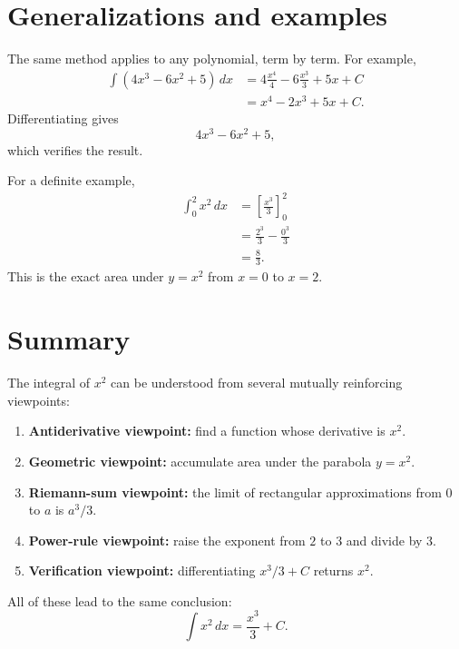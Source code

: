 \documentclass[11pt]{article}
\begin{document}
\section{Generalizations and examples}

The same method applies to any polynomial, term by term. For example,
\begin{align*}
\int \left(4x^3-6x^2+5\right)\,dx
&=4\frac{x^4}{4}-6\frac{x^3}{3}+5x+C\\
&=x^4-2x^3+5x+C.
\end{align*}
Differentiating gives
\[
4x^3-6x^2+5,
\]
which verifies the result.

For a definite example,
\begin{align*}
\int_0^2 x^2\,dx
&=\left[\frac{x^3}{3}\right]_0^2\\
&=\frac{2^3}{3}-\frac{0^3}{3}\\
&=\frac{8}{3}.
\end{align*}
This is the exact area under $y=x^2$ from $x=0$ to $x=2$.

\section{Summary}

The integral of $x^2$ can be understood from several mutually reinforcing viewpoints:
\begin{enumerate}[leftmargin=2em]
  \item \textbf{Antiderivative viewpoint:} find a function whose derivative is $x^2$.
  \item \textbf{Geometric viewpoint:} accumulate area under the parabola $y=x^2$.
  \item \textbf{Riemann-sum viewpoint:} the limit of rectangular approximations from $0$ to $a$ is $a^3/3$.
  \item \textbf{Power-rule viewpoint:} raise the exponent from $2$ to $3$ and divide by $3$.
  \item \textbf{Verification viewpoint:} differentiating $x^3/3+C$ returns $x^2$.
\end{enumerate}
All of these lead to the same conclusion:
\[
\boxed{\displaystyle \int x^2\,dx=\frac{x^3}{3}+C.}
\]
\end{document}
